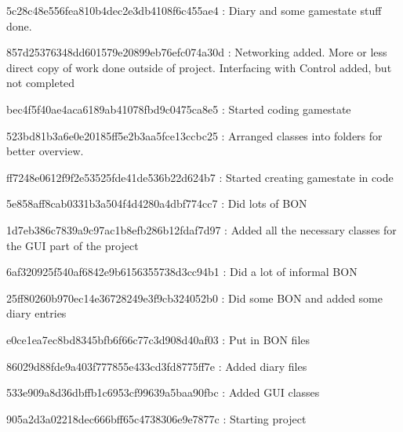 5c28c48e556fea810b4dec2e3db4108f6c455ae4 : Diary and some gamestate stuff done.

857d25376348dd601579e20899eb76efc074a30d : Networking added. More or less direct copy of work done outside of project. Interfacing with Control added, but not completed

bec4f5f40ae4aca6189ab41078fbd9c0475ca8e5 : Started coding gamestate

523bd81b3a6e0e20185ff5e2b3aa5fce13ccbc25 : Arranged classes into folders for better overview.

ff7248e0612f9f2e53525fde41de536b22d624b7 : Started creating gamestate in code

5e858aff8cab0331b3a504f4d4280a4dbf774cc7 : Did lots of BON

1d7eb386c7839a9c97ac1b8efb286b12fdaf7d97 : Added all the necessary classes for the GUI part of the project

6af320925f540af6842e9b6156355738d3cc94b1 : Did a lot of informal BON

25ff80260b970ec14e36728249e3f9cb324052b0 : Did some BON and added some diary entries

e0ce1ea7ec8bd8345bfb6f66c77c3d908d40af03 : Put in BON files

86029d88fde9a403f777855e433cd3fd8775ff7e : Added diary files

533e909a8d36dbffb1c6953cf99639a5baa90fbc  : Added GUI classes 

905a2d3a02218dec666bff65c4738306e9e7877c : Starting project 